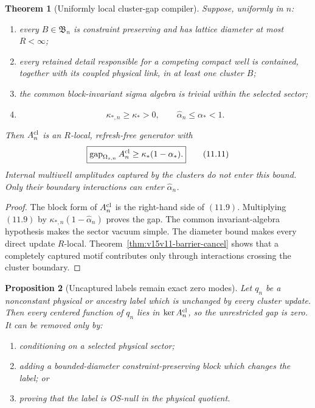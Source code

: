 \documentclass[11pt]{article}
\newtheorem{theorem}{Theorem}[section]
\newtheorem{proposition}[theorem]{Proposition}
\theoremstyle{remark}
\begin{document}
\begin{theorem}[Uniformly local cluster-gap compiler]
\label{thm:v15v11-cluster-gap}
Suppose, uniformly in \(n\):
\begin{enumerate}
\item every \(B\in{\mathfrak B}_n\) is constraint preserving and
      has lattice diameter at most \(R<\infty\);
\item every retained detail responsible for a competing compact
      well is contained, together with its coupled physical link,
      in at least one cluster \(B\);
\item the common block-invariant sigma algebra is trivial within
      the selected sector;
\item
      \[
       \kappa_{*,n}\ge\kappa_*>0,\qquad
       \widehat\alpha_n\le\alpha_*<1.                        \tag{11.10}
      \]
\end{enumerate}
Then \(A_n^{\rm cl}\) is an \(R\)-local, refresh-free generator
with
\[
 \boxed{
 \operatorname{gap}_{\Omega_{s,n}}A_n^{\rm cl}
 \ge\kappa_*(1-\alpha_*).}                                  \tag{11.11}
\]
Internal multiwell amplitudes captured by the clusters do not
enter this bound.  Only their boundary interactions can enter
\(\widehat\alpha_n\).
\end{theorem}

\begin{proof}
The block form of \(A_n^{\rm cl}\) is the right-hand side of
\((11.9)\).  Multiplying \((11.9)\) by
\(\kappa_{*,n}(1-\widehat\alpha_n)\) proves the gap.  The common
invariant-algebra hypothesis makes the sector vacuum simple.
The diameter bound makes every direct update \(R\)-local.
Theorem~\ref{thm:v15v11-barrier-cancel} shows that a completely
captured motif contributes only through interactions crossing the
cluster boundary.
\end{proof}

\begin{proposition}[Uncaptured labels remain exact zero modes]
\label{prop:v15v11-uncaptured}
Let \(q_n\) be a nonconstant physical or ancestry label which is
unchanged by every cluster update.  Then every centered function
of \(q_n\) lies in \(\ker A_n^{\rm cl}\), so the unrestricted
gap is zero.  It can be removed only by:
\begin{enumerate}
\item conditioning on a selected physical sector;
\item adding a bounded-diameter constraint-preserving block which
      changes the label; or
\item proving that the label is OS-null in the physical quotient.
\end{enumerate}
\end{proposition}
\end{document}
